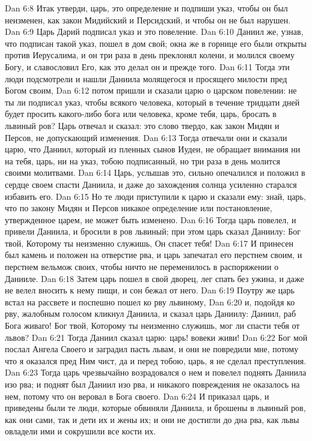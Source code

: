 Dan 6:8  Итак утверди, царь, это определение и подпиши указ, чтобы он был неизменен, как закон Мидийский и Персидский, и чтобы он не был нарушен.
Dan 6:9  Царь Дарий подписал указ и это повеление.
Dan 6:10  Даниил же, узнав, что подписан такой указ, пошел в дом свой; окна же в горнице его были открыты против Иерусалима, и он три раза в день преклонял колени, и молился своему Богу, и славословил Его, как это делал он и прежде того.
Dan 6:11  Тогда эти люди подсмотрели и нашли Даниила молящегося и просящего милости пред Богом своим,
Dan 6:12  потом пришли и сказали царю о царском повелении: не ты ли подписал указ, чтобы всякого человека, который в течение тридцати дней будет просить какого-либо бога или человека, кроме тебя, царь, бросать в львиный ров? Царь отвечал и сказал: это слово твердо, как закон Мидян и Персов, не допускающий изменения.
Dan 6:13  Тогда отвечали они и сказали царю, что Даниил, который из пленных сынов Иудеи, не обращает внимания ни на тебя, царь, ни на указ, тобою подписанный, но три раза в день молится своими молитвами.
Dan 6:14  Царь, услышав это, сильно опечалился и положил в сердце своем спасти Даниила, и даже до захождения солнца усиленно старался избавить его.
Dan 6:15  Но те люди приступили к царю и сказали ему: знай, царь, что по закону Мидян и Персов никакое определение или постановление, утвержденное царем, не может быть изменено.
Dan 6:16  Тогда царь повелел, и привели Даниила, и бросили в ров львиный; при этом царь сказал Даниилу: Бог твой, Которому ты неизменно служишь, Он спасет тебя!
Dan 6:17  И принесен был камень и положен на отверстие рва, и царь запечатал его перстнем своим, и перстнем вельмож своих, чтобы ничто не переменилось в распоряжении о Данииле.
Dan 6:18  Затем царь пошел в свой дворец, лег спать без ужина, и даже не велел вносить к нему пищи, и сон бежал от него.
Dan 6:19  Поутру же царь встал на рассвете и поспешно пошел ко рву львиному,
Dan 6:20  и, подойдя ко рву, жалобным голосом кликнул Даниила, и сказал царь Даниилу: Даниил, раб Бога живаго! Бог твой, Которому ты неизменно служишь, мог ли спасти тебя от львов?
Dan 6:21  Тогда Даниил сказал царю: царь! вовеки живи!
Dan 6:22  Бог мой послал Ангела Своего и заградил пасть львам, и они не повредили мне, потому что я оказался пред Ним чист, да и перед тобою, царь, я не сделал преступления.
Dan 6:23  Тогда царь чрезвычайно возрадовался о нем и повелел поднять Даниила изо рва; и поднят был Даниил изо рва, и никакого повреждения не оказалось на нем, потому что он веровал в Бога своего.
Dan 6:24  И приказал царь, и приведены были те люди, которые обвиняли Даниила, и брошены в львиный ров, как они сами, так и дети их и жены их; и они не достигли до дна рва, как львы овладели ими и сокрушили все кости их.
